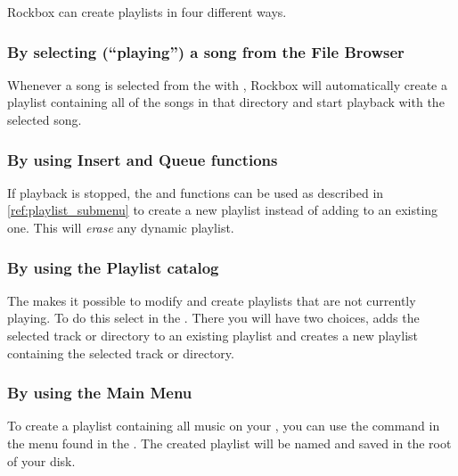 Rockbox can create playlists in four different ways.

\subsubsection{By selecting (``playing'') a song from the File Browser}
Whenever a song is selected from the  with
\ActionTreeEnter, Rockbox will automatically create a playlist containing
all of the songs in that directory and start playback with the selected
song.\\


\subsubsection{By using Insert and Queue functions}
If playback is stopped, the  and  functions
can be used as described in \ref{ref:playlist_submenu}
to create a new playlist instead of adding to an existing one.
This will \emph{erase} any dynamic playlist.

\subsubsection{\label{ref:playlist_catalog}By using the Playlist catalog}
The  makes it possible to modify and create playlists
that are not currently playing. To do this select 
in the . There you will have two choices,
 adds the selected track or directory to an existing
playlist and  creates a new playlist containing
the selected track or directory.\\


\subsubsection{By using the Main Menu}
To create a playlist containing all music on your \dap{}, you can use the
 command in the  menu found
in the . The created playlist will be named
 and saved in the root of your \daps{} disk.

